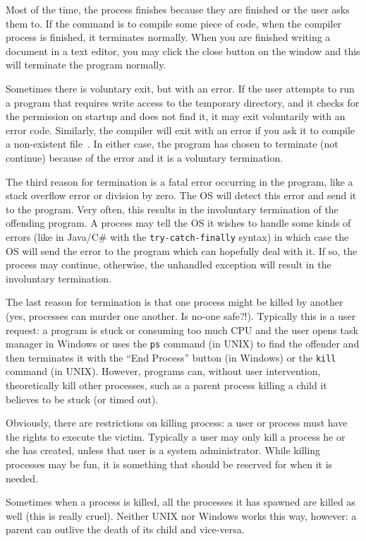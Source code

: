 Most of the time, the process finishes because they are finished or the user asks them to. If the command is to compile some piece of code, when the compiler process is finished, it terminates normally. When you are finished writing a document in a text editor, you may click the close button on the window and this will terminate the program normally.

Sometimes there is voluntary exit, but with an error. If the user attempts to run a program that requires write access to the temporary directory, and it checks for the permission on startup and does not find it, it may exit voluntarily with an error code. Similarly, the compiler will exit with an error if you ask it to compile a non-existent file~\cite{mos}. In either case, the program has chosen to terminate (not continue) because of the error and it is a voluntary termination.

The third reason for termination is a fatal error occurring in the program, like a stack overflow error or division by zero. The OS will detect this error and send it to the program. Very often, this results in the involuntary termination of the offending program. A process may tell the OS it wishes to handle some kinds of errors (like in Java/C\# with the \texttt{try-catch-finally} syntax) in which case the OS will send the error to the program which can hopefully deal with it. If so, the process may continue, otherwise, the unhandled exception will result in the involuntary termination.

The last reason for termination is that one process might be killed by another (yes, processes can murder one another. Is no-one safe?!). Typically this is a user request: a program is stuck or consuming too much CPU and the user opens task manager in Windows or uses the \texttt{ps} command (in UNIX) to find the offender and then terminates it with the ``End Process'' button (in Windows) or the \texttt{kill} command (in UNIX). However, programs can, without user intervention, theoretically kill other processes, such as a parent process killing a child it believes to be stuck (or timed out).

Obviously, there are restrictions on killing process: a user or process must have the rights to execute the victim. Typically a user may only kill a process he or she has created, unless that user is a system administrator. While killing processes may be fun, it is something that should be reserved for when it is needed.

Sometimes when a process is killed, all the processes it has spawned are killed as well (this is really cruel). Neither UNIX nor Windows works this way, however: a parent can outlive the death of its child and vice-versa.

